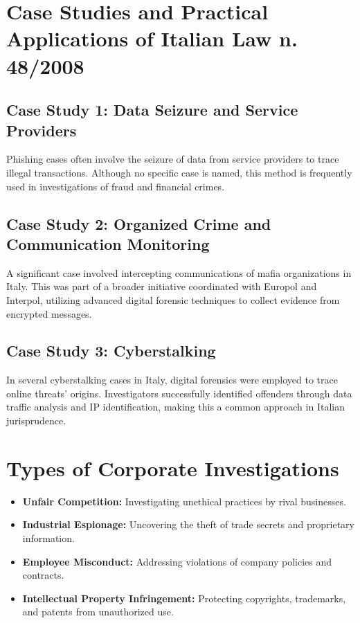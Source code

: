 \section{Case Studies and Practical Applications of Italian Law n. 48/2008}

\subsection{Case Study 1: Data Seizure and Service Providers}
Phishing cases often involve the seizure of data from service providers to trace illegal transactions. Although no specific case is named, this method is frequently used in investigations of fraud and financial crimes.

\subsection{Case Study 2: Organized Crime and Communication Monitoring}
A significant case involved intercepting communications of mafia organizations in Italy. This was part of a broader initiative coordinated with Europol and Interpol, utilizing advanced digital forensic techniques to collect evidence from encrypted messages.

\subsection{Case Study 3: Cyberstalking}
In several cyberstalking cases in Italy, digital forensics were employed to trace online threats' origins. Investigators successfully identified offenders through data traffic analysis and IP identification, making this a common approach in Italian jurisprudence.

\section{Types of Corporate Investigations}
\begin{itemize}[itemsep=0pt]
    \item \textbf{Unfair Competition:} Investigating unethical practices by rival businesses.
    \item \textbf{Industrial Espionage:} Uncovering the theft of trade secrets and proprietary information.
    \item \textbf{Employee Misconduct:} Addressing violations of company policies and contracts.
    \item \textbf{Intellectual Property Infringement:} Protecting copyrights, trademarks, and patents from unauthorized use.
\end{itemize}

